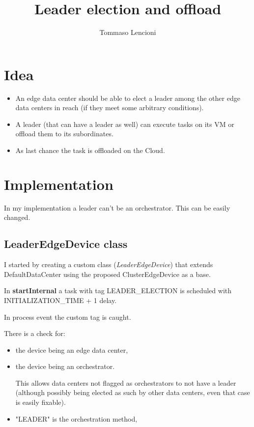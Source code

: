 \documentclass[12pt, a4paper]{report} %
\title{Leader election and offload}
\author{Tommaso Lencioni}
\begin{document}
\section*{Idea}
\begin{itemize}
	\item An edge data center should be able to elect a leader among the other edge data centers in reach (if they meet some arbitrary conditions).
	\item A leader (that can have a leader as well) can execute tasks on its VM or offload them to its subordinates.
	\item As last chance the task is offloaded on the Cloud.
\end{itemize}

\section*{Implementation}
In my implementation a leader can't be an orchestrator. This can be easily changed.
\subsection*{LeaderEdgeDevice class}
I started by creating a custom class (\textit{LeaderEdgeDevice}) that extends DefaultDataCenter using the proposed ClusterEdgeDevice as a base.

In \textbf{startInternal} a task with tag LEADER\_ELECTION is scheduled with INITIALIZATION\_TIME + 1 delay.

In process event the custom tag is caught.

There is a check for:
 	\begin{itemize}
 		\item the device being an edge data center,
 		\item the device being an orchestrator.
 		
 		This allows data centers not flagged as orchestrators to not have a leader (although possibly being elected as such by other data centers, even that case is easily fixable).
 		\item "LEADER" is the orchestration method,
  	\end{itemize}
\end{document}

